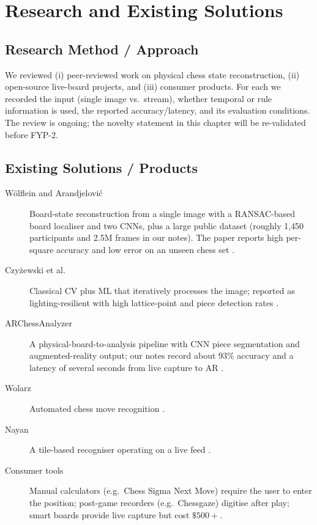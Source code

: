 \chapter{Research and Existing Solutions}
\section{Research Method / Approach}
We reviewed (i) peer-reviewed work on physical chess state reconstruction, (ii) open-source live-board projects, and
(iii) consumer products. For each we recorded the input (single image vs.\ stream), whether temporal or rule
information is used, the reported accuracy/latency, and its evaluation conditions. The review is ongoing; the novelty
statement in this chapter will be re-validated before FYP-2.

\section{Existing Solutions / Products}
\begin{description}
\item[Wölflein and Arandjelović] Board-state reconstruction from a single image with a RANSAC-based board
localiser and two CNNs, plus a large public dataset (roughly 1{,}450 participants and 2.5M frames in our notes). The
paper reports high per-square accuracy and low error on an unseen chess set \cite{wolflein2021}.
\item[Czyżewski et al.] Classical CV plus ML that iteratively processes the image; reported as lighting-resilient with high lattice-point and piece detection rates \cite{czyzewski2020}. 
\item[ARChessAnalyzer] A physical-board-to-analysis pipeline with CNN piece segmentation and augmented-reality output; our notes record about 93\% accuracy and a latency of several seconds from live capture to AR \cite{archess}. 
\item[Wolarz] Automated chess move recognition \cite{wolarz}. 
\item[Nayan] A tile-based recogniser operating on a live feed \cite{nayan}. 
\item[Consumer tools] Manual calculators (e.g.\ Chess Sigma Next Move) require the user to enter the position; post-game recorders (e.g.\ Chessgaze) digitise after play; smart boards provide live capture but cost $\$500+$.
\end{description}


